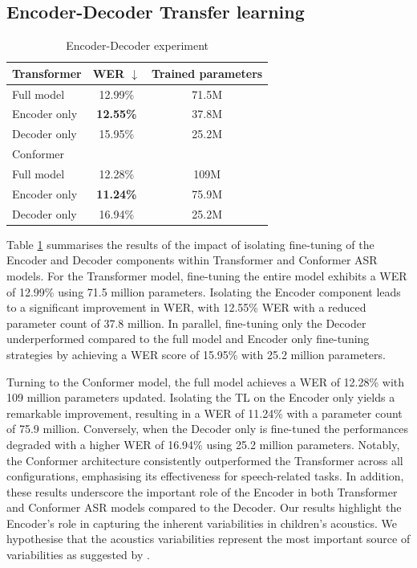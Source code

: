 \subsection{Encoder-Decoder Transfer learning}
\begin{table}
    \begin{center}
        \begin{tabular}{lcc}\hline
            Transformer    &   \ac{WER} $\downarrow$    & Trained parameters  \\ \hline
            Full model          & 12.99\% & 71.5M   \\
            Encoder only & \textbf{12.55\%} & 37.8M  \\
            Decoder only & 15.95\% & 25.2M  \\ \hline \hline
            Conformer    &    & \\ \hline
            Full model          & 12.28\% & 109M   \\
            Encoder only & \textbf{11.24\%} & 75.9M  \\
            Decoder only & 16.94\% & 25.2M  \\ \hline 

        \end{tabular}
    \end{center}
    \caption{Encoder-Decoder experiment}
    \label{tab:EncoderDecoder}
\end{table}
Table \ref{tab:EncoderDecoder} summarises the results of the impact of isolating fine-tuning of the Encoder and Decoder components within Transformer and Conformer \ac{ASR} models. For the Transformer model, fine-tuning the entire model exhibits a \ac{WER} of 12.99\% using 71.5 million parameters. Isolating the Encoder component leads to a significant improvement in \ac{WER}, with 12.55\% \ac{WER} with a reduced parameter count of 37.8 million. In parallel, fine-tuning only the Decoder underperformed compared to the full model and Encoder only fine-tuning strategies by achieving a \ac{WER} score of 15.95\% with 25.2 million parameters.

Turning to the Conformer model, the full model achieves a \ac{WER} of 12.28\% with 109 million parameters updated. Isolating the \ac{TL} on the Encoder only yields a remarkable improvement, resulting in a \ac{WER} of 11.24\% with a parameter count of 75.9 million. Conversely, when the Decoder only is fine-tuned the performances degraded with a higher \ac{WER} of 16.94\% using 25.2 million parameters. Notably, the Conformer architecture consistently outperformed the Transformer across all configurations, emphasising its effectiveness for speech-related tasks. In addition, these results underscore the important role of the Encoder in both Transformer and Conformer \ac{ASR} models compared to the Decoder. Our results highlight the Encoder's role in capturing the inherent variabilities in children's acoustics. We hypothesise that the acoustics variabilities represent the most important source of variabilities as suggested by \cite{TFchildren}.

